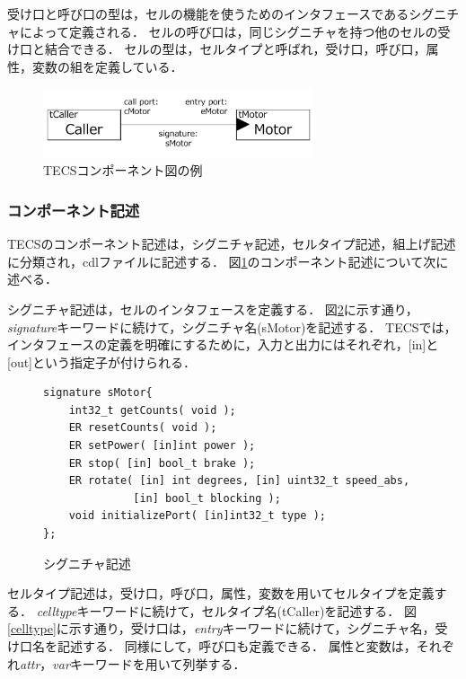 \documentclass[submit]{ipsj_v2/UTF8/ipsj}
\begin{document}
受け口と呼び口の型は，セルの機能を使うためのインタフェースであるシグニチャによって定義される．
セルの呼び口は，同じシグニチャを持つ他のセルの受け口と結合できる．
セルの型は，セルタイプと呼ばれ，受け口，呼び口，属性，変数の組を定義している．

\begin{figure}[t]
    \centering
    \includegraphics[width=8cm,clip]{../EMSOFT2016/figure/component_diagram.pdf}
    \caption{TECSコンポーネント図の例}
    \label{fig:component}
\end{figure}

\subsubsection{コンポーネント記述}
TECSのコンポーネント記述は，シグニチャ記述，セルタイプ記述，組上げ記述に分類され，cdlファイルに記述する．
図\ref{fig:component}のコンポーネント記述について次に述べる．

        シグニチャ記述は，セルのインタフェースを定義する．
        図\ref{signature}に示す通り，{\it signature}キーワードに続けて，シグニチャ名(sMotor)を記述する．
        TECSでは，インタフェースの定義を明確にするために，入力と出力にはそれぞれ，[in]と[out]という指定子が付けられる．
        
\begin{figure}[t]
\centering
\begin{lstlisting}
signature sMotor{
    int32_t getCounts( void );
    ER resetCounts( void );
    ER setPower( [in]int power );
    ER stop( [in] bool_t brake );
    ER rotate( [in] int degrees, [in] uint32_t speed_abs,
              [in] bool_t blocking );
    void initializePort( [in]int32_t type );
};
\end{lstlisting}
\caption{シグニチャ記述}
\label{signature}
\end{figure}

        セルタイプ記述は，受け口，呼び口，属性，変数を用いてセルタイプを定義する．
        {\it celltype}キーワードに続けて，セルタイプ名(tCaller)を記述する．
        図\ref{celltype}に示す通り，受け口は，{\it entry}キーワードに続けて，シグニチャ名，受け口名を記述する．
        同様にして，呼び口も定義できる．
        属性と変数は，それぞれ{\it attr}，{\it var}キーワードを用いて列挙する．
\end{document}
